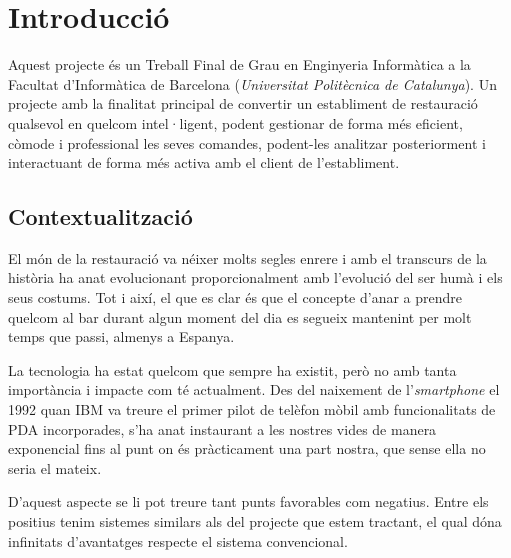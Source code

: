 
\chapter{Introducció} %

\label{Chapter1} %


\newcommand{\keyword}[1]{\textbf{#1}}
\newcommand{\tabhead}[1]{\textbf{#1}}
\newcommand{\code}[1]{\texttt{#1}}
\newcommand{\file}[1]{\texttt{\bfseries#1}}
\newcommand{\option}[1]{\texttt{\itshape#1}}


Aquest projecte és un Treball Final de Grau en Enginyeria Informàtica a la Facultat d'Informàtica de Barcelona (\textit{Universitat Politècnica de Catalunya}). Un projecte amb la finalitat principal de convertir un establiment de restauració qualsevol en quelcom intel·ligent, podent gestionar de forma més eficient, còmode i professional les seves comandes, podent-les analitzar posteriorment i interactuant de forma més activa amb el client de l'establiment.

\section{Contextualització}

El món de la restauració va néixer molts segles enrere i amb el transcurs de la història ha anat evolucionant proporcionalment amb l'evolució del ser humà i els seus costums. Tot i així, el que es clar és que el concepte d'anar a prendre quelcom al bar durant algun moment del dia es segueix mantenint per molt temps que passi, almenys a Espanya.

La tecnologia ha estat quelcom que sempre ha existit, però no amb tanta importància i impacte com té actualment. Des del naixement de l'\textit{smartphone} \cite{smartphone} el 1992 quan IBM va treure el primer pilot de telèfon mòbil amb funcionalitats de PDA incorporades, s'ha anat instaurant a les nostres vides de manera exponencial fins al punt on és pràcticament una part nostra, que sense ella no seria el mateix.

D'aquest aspecte se li pot treure tant punts favorables com negatius. Entre els positius tenim sistemes similars als del projecte que estem tractant, el qual dóna infinitats d'avantatges respecte el sistema convencional.

